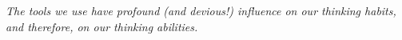 \subsection{}
{

\begin{frame}{}
 
\Large 
\textit{ 
The tools we use have profound (and devious!) influence on our 
thinking habits, and therefore, on our thinking abilities.}

\end{frame}
}




